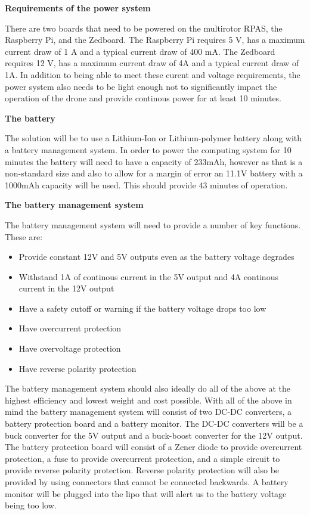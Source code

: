 \textbf{Requirements of the power system}

 There are two boards that need to be powered on the multirotor RPAS, the Raspberry Pi, and the Zedboard. The Raspberry Pi requires
5 V, has a maximum current draw of 1 A and a typical current draw of 400 mA. The Zedboard requires 12 V, has a maximum current draw of
4A and a typical current draw of 1A. In addition to being able to meet these curent and voltage requirements, the power system also
needs to be light enough not to significantly impact the operation of the drone and provide continous power for at least 10 minutes.

\textbf{The battery}

The solution will be to use a Lithium-Ion or Lithium-polymer battery along with a battery management system. In order to
power the computing system for 10 minutes the battery will need to have a capacity of 233mAh, however as that is a non-standard size and also to allow for a margin of error an 11.1V battery with a 1000mAh capacity will be used. This should provide 43 minutes of operation.

\textbf{The battery management system}

The battery management system will need to provide a number of key functions. These are:
  
  \begin{itemize}
\item Provide constant 12V and 5V outputs even as the battery voltage degrades
\item Withstand 1A of continous current in the 5V output and 4A continous current in the 12V output
\item Have a safety cutoff or warning if the battery voltage drops too low
\item Have overcurrent protection
\item Have overvoltage protection
\item Have reverse polarity protection
\end{itemize}
 
The battery management system should also ideally do all of the above at the highest efficiency and lowest weight and cost possible. With all of the above in mind the battery management system will consist of two DC-DC converters, a battery protection board and a battery monitor. The DC-DC converters will be a buck converter for the 5V output and a buck-boost converter for the 12V output. The battery protection board will consist of a Zener diode to provide overcurrent protection, a fuse to provide overcurrent protection, and a simple circuit to provide reverse polarity protection. Reverse polarity protection will also be provided by using connectors that cannot be connected backwards. A battery monitor will be plugged into the lipo that will alert us to the battery voltage being too low.

